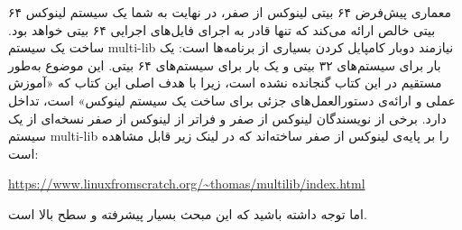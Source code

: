 \documentclass{book}
\begin{document}
\newline
معماری پیش‌فرض ۶۴ بیتی لینوکس از صفر، در نهایت به شما یک سیستم لینوکس ۶۴ بیتی خالص ارائه می‌کند که تنها قادر به اجرای فایل‌های اجرایی ۶۴ بیتی خواهد بود. ساخت یک سیستم multi-lib نیازمند دوبار کامپایل کردن بسیاری از برنامه‌ها است: یک بار برای سیستم‌های ۳۲ بیتی و یک بار برای سیستم‌های ۶۴ بیتی. این موضوع به‌طور مستقیم در این کتاب گنجانده نشده است، زیرا با هدف اصلی این کتاب که «آموزش عملی و ارائه‌ی دستورالعمل‌های جزئی برای ساخت یک سیستم لینوکس» است، تداخل دارد.
\newline
\newline
برخی از نویسندگان لینوکس از صفر و فراتر از لینوکس از صفر نسخه‌ای از یک سیستم multi-lib را بر پایه‌ی لینوکس از صفر ساخته‌اند که در لینک زیر قابل مشاهده است:

\begin{center}
\url{https://www.linuxfromscratch.org/~thomas/multilib/index.html}
\end{center}

\par
اما توجه داشته باشید که این مبحث بسیار پیشرفته و سطح بالا است.
\end{document}
